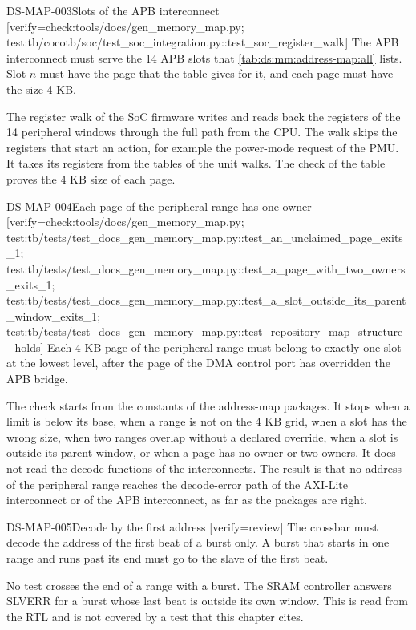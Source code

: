\begin{requirement}{DS-MAP-003}{Slots of the APB interconnect}
[verify={check:tools/docs/gen_memory_map.py; test:tb/cocotb/soc/test_soc_integration.py::test_soc_register_walk}]
The APB interconnect must serve the 14 APB slots that \cref{tab:ds:mm:address-map:all} lists. Slot $n$ must have the page that the table gives for it, and each page must have the size 4 KB.
\end{requirement}
\begin{information}
The register walk of the SoC firmware writes and reads back the registers of the 14 peripheral windows through the full path from the CPU. The walk skips the registers that start an action, for example the power-mode request of the PMU. It takes its registers from the tables of the unit walks. The check of the table proves the 4 KB size of each page.
\end{information}

\begin{requirement}{DS-MAP-004}{Each page of the peripheral range has one owner}
[verify={check:tools/docs/gen_memory_map.py; test:tb/tests/test_docs_gen_memory_map.py::test_an_unclaimed_page_exits_1; test:tb/tests/test_docs_gen_memory_map.py::test_a_page_with_two_owners_exits_1; test:tb/tests/test_docs_gen_memory_map.py::test_a_slot_outside_its_parent_window_exits_1; test:tb/tests/test_docs_gen_memory_map.py::test_repository_map_structure_holds}]
Each 4 KB page of the peripheral range must belong to exactly one slot at the lowest level, after the page of the DMA control port has overridden the APB bridge.
\end{requirement}
\begin{information}
The check starts from the constants of the address-map packages. It stops when a limit is below its base, when a range is not on the 4 KB grid, when a slot has the wrong size, when two ranges overlap without a declared override, when a slot is outside its parent window, or when a page has no owner or two owners. It does not read the decode functions of the interconnects. The result is that no address of the peripheral range reaches the decode-error path of the AXI-Lite interconnect or of the APB interconnect, as far as the packages are right.
\end{information}

\begin{requirement}{DS-MAP-005}{Decode by the first address}
[verify={review}]
The crossbar must decode the address of the first beat of a burst only. A burst that starts in one range and runs past its end must go to the slave of the first beat.
\end{requirement}
\begin{information}
No test crosses the end of a range with a burst. The SRAM controller answers SLVERR for a burst whose last beat is outside its own window. This is read from the RTL and is not covered by a test that this chapter cites.
\end{information}

